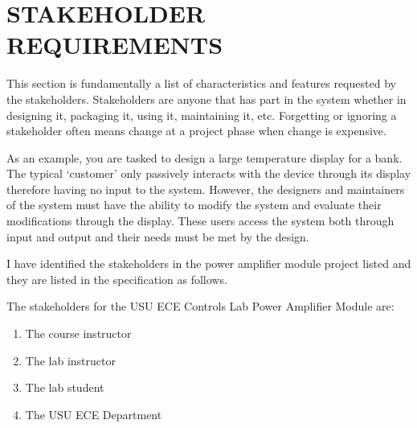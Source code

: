 \section{STAKEHOLDER REQUIREMENTS} %
\begin{slshape} \color{blue}
This section is fundamentally a list of characteristics and features requested by the stakeholders.  Stakeholders are anyone that has part in the system whether in designing it, packaging it, using it, maintaining it, etc.  Forgetting or ignoring a stakeholder often means change at a project phase when change is expensive.
\bigskip

As an example, you are tasked to design a large temperature display for a bank.  The typical `customer' only passively interacts with the device through its display therefore having no input to the system.  However, the designers and maintainers of 	the system must have the ability to modify the system and evaluate their modifications through the display.  These users access the system both through input and output and their needs must be met by the design.   
\bigskip

I have identified the stakeholders in the power amplifier module project listed and they are listed in the specification as follows.
\bigskip
\end{slshape}

The stakeholders for the USU ECE Controls Lab Power Amplifier Module are:

\begin{enumerate}
	\item The course instructor
	\item The lab instructor
	\item The lab student
	\item The USU ECE Department
\end{enumerate}


